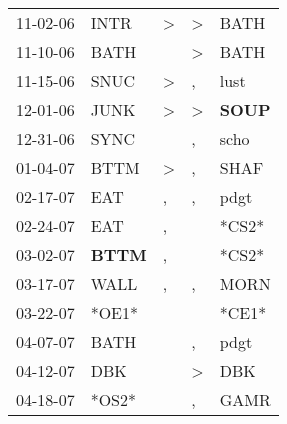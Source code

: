 \begin{supertabular}{p{0.07\textwidth}p{0.06\textwidth}p{0.02\textwidth}p{0.02\textwidth}p{0.06\textwidth}}
          11-02-06\textsuperscript{} &           INTR\textsuperscript{} &     \textgreater &     \textgreater &           BATH\textsuperscript{} \\
          11-10-06\textsuperscript{} &           BATH\textsuperscript{} &                  &     \textgreater &           BATH\textsuperscript{} \\
          11-15-06\textsuperscript{} &           SNUC\textsuperscript{} &     \textgreater &                , &           lust\textsuperscript{} \\
          12-01-06\textsuperscript{} &           JUNK\textsuperscript{} &     \textgreater &     \textgreater &  \textbf{SOUP\textsuperscript{}} \\
          12-31-06\textsuperscript{} &           SYNC\textsuperscript{} &                  &                , &           scho\textsuperscript{} \\
          01-04-07\textsuperscript{} &           BTTM\textsuperscript{} &     \textgreater &                , &           SHAF\textsuperscript{} \\
          02-17-07\textsuperscript{} &            EAT\textsuperscript{} &                , &                , &           pdgt\textsuperscript{} \\
          02-24-07\textsuperscript{} &            EAT\textsuperscript{} &                , &                  &                            *CS2* \\
          03-02-07\textsuperscript{} &  \textbf{BTTM\textsuperscript{}} &                , &                  &                            *CS2* \\
          03-17-07\textsuperscript{} &           WALL\textsuperscript{} &                , &                , &           MORN\textsuperscript{} \\
          03-22-07\textsuperscript{} &                            *OE1* &                  &                  &                            *CE1* \\
          04-07-07\textsuperscript{} &           BATH\textsuperscript{} &                  &                , &           pdgt\textsuperscript{} \\
          04-12-07\textsuperscript{} &            DBK\textsuperscript{} &                  &     \textgreater &            DBK\textsuperscript{} \\
          04-18-07\textsuperscript{} &                            *OS2* &                  &                , &           GAMR\textsuperscript{} \\

\end{supertabular}
